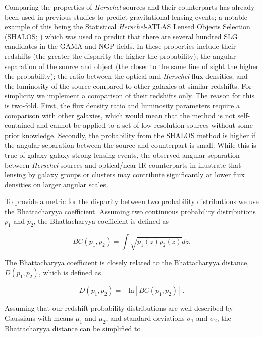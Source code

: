 Comparing the properties of \textit{Herschel} sources and their counterparts has already been used in previous studies to predict gravitational lensing events; a notable example of this being the Statistical \textit{Herschel}-ATLAS Lensed Objects Selection (SHALOS; \citealt{Gonzalez-Nuevo_2019}) which was used to predict that there are several hundred SLG candidates in the GAMA and NGP fields. In \citealt{Gonzalez-Nuevo_2019} these properties include their redshifts (the greater the disparity the higher the probability); the angular separation of the source and object (the closer to the same line of sight the higher the probability); the ratio between the optical and \textit{Herschel} flux densities; and the luminosity of the source compared to other galaxies at similar redshifts. For simplicity we implement a comparison of their redshifts only. The reason for this is two-fold. First, the flux density ratio and luminosity parameters require a comparison with other galaxies, which would mean that the method is not self-contained and cannot be applied to a set of low resolution sources without some prior knowledge. Secondly, the probability from the SHALOS method is higher if the angular separation between the source and counterpart is small. While this is true of galaxy-galaxy strong lensing events, the observed angular separation between \textit{Herschel} sources and optical/near-IR counterparts in \citealt{Bakx_2020} illustrate that lensing by galaxy groups or clusters may contribute significantly at lower flux densities on larger angular scales.

To provide a metric for the disparity between two probability distributions we use the Bhattacharyya coefficient. Assuming two continuous probability distributions $p_1$ and $p_2$, the Bhattacharyya coefficient is defined as

\begin{equation}
    BC(p_1, p_2) = \int \sqrt{p_1(z) p_2(z)} dz.
\end{equation}

The Bhattacharyya coefficient is closely related to the Bhattacharyya distance, $D(p_1,p_2)$, which is defined as

\begin{equation}
    D(p_1, p_2) = -\textrm{ln}[BC(p_1, p_2)].
\label{eq:Bhattacharyya_distance}
\end{equation}

Assuming that our redshift probability distributions are well described by Gaussians with means $\mu_1$ and $\mu_2$, and standard deviations $\sigma_1$ and $\sigma_2$, the Bhattacharyya distance can be simplified to

